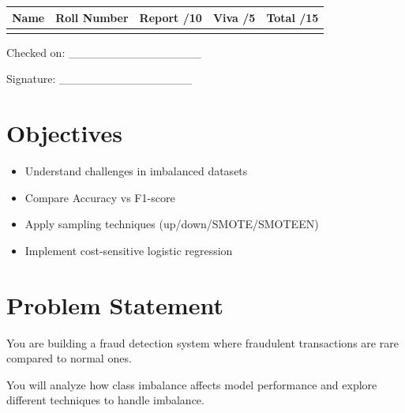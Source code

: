 \documentclass[12pt,a4paper]{article}
\begin{document}
\renewcommand{\arraystretch}{2.0}
\begin{tabularx}{\textwidth}{|Y|Y|Y|Y|Y|}
\hline
\textbf{Name} & \textbf{Roll Number} & \textbf{Report /10} & \textbf{Viva /5} & \textbf{Total /15} \\
\hline
 & & & & \\
\hline
\end{tabularx}
\renewcommand{\arraystretch}{1.0}

\vspace{12pt}

\begin{flushright}
Checked on: \_\_\_\_\_\_\_\_\_\_\_\_\_\_\_\_

\vspace{6pt}
Signature: \_\_\_\_\_\_\_\_\_\_\_\_\_\_\_\_
\end{flushright}

\newpage


\section*{Objectives}

\begin{itemize}
\item Understand challenges in imbalanced datasets
\item Compare Accuracy vs F1-score
\item Apply sampling techniques (up/down/SMOTE/SMOTEEN)
\item Implement cost-sensitive logistic regression
\end{itemize}


\section*{Problem Statement}

You are building a fraud detection system where fraudulent transactions are rare compared to normal ones.

You will analyze how class imbalance affects model performance and explore different techniques to handle imbalance.
\end{document}
